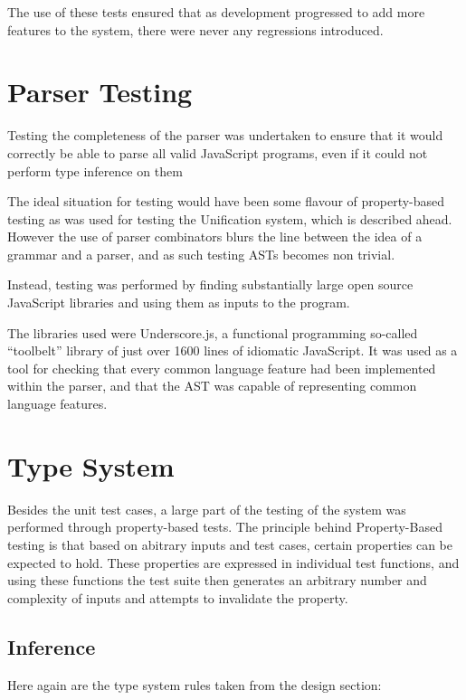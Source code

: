 \documentclass[british, twoside]{bhamthesis}
\theoremstyle{definition}
\begin{document}
    The use of these tests ensured that as development progressed to add more features to the system, there were never any regressions introduced.

  \section{Parser Testing}
    Testing the completeness of the parser was undertaken to ensure that it would correctly be able to parse all valid JavaScript programs, even if it could not perform type inference on them

    The ideal situation for testing would have been some flavour of property-based testing as was used for testing the Unification system, which is described ahead. However the use of parser combinators blurs the line between the idea of a grammar and a parser, and as such testing ASTs becomes non trivial.

    Instead, testing was performed by finding substantially large open source JavaScript libraries and using them as inputs to the program.

    The libraries used were Underscore.js, a functional programming so-called ``toolbelt'' library of just over 1600 lines of idiomatic JavaScript. It was used as a tool for checking that every common language feature had been implemented within the parser, and that the AST was capable of representing common language features.

  \section{Type System}
    Besides the unit test cases, a large part of the testing of the system was performed through property-based tests. The principle behind Property-Based testing\autocite{Fink1997} is that based on abitrary inputs and test cases, certain properties can be expected to hold. These properties are expressed in individual test functions, and using these functions the test suite then generates an arbitrary number and complexity of inputs and attempts to invalidate the property.

    \subsection{Inference}

      Here again are the type system rules taken from the design section:
\end{document}
